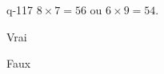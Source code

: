 \begin{truefalse}{q-117}
$8\times 7 = 56$ ou $6\times 9 = 54$.
\item* Vrai
\item Faux
\end{truefalse}

